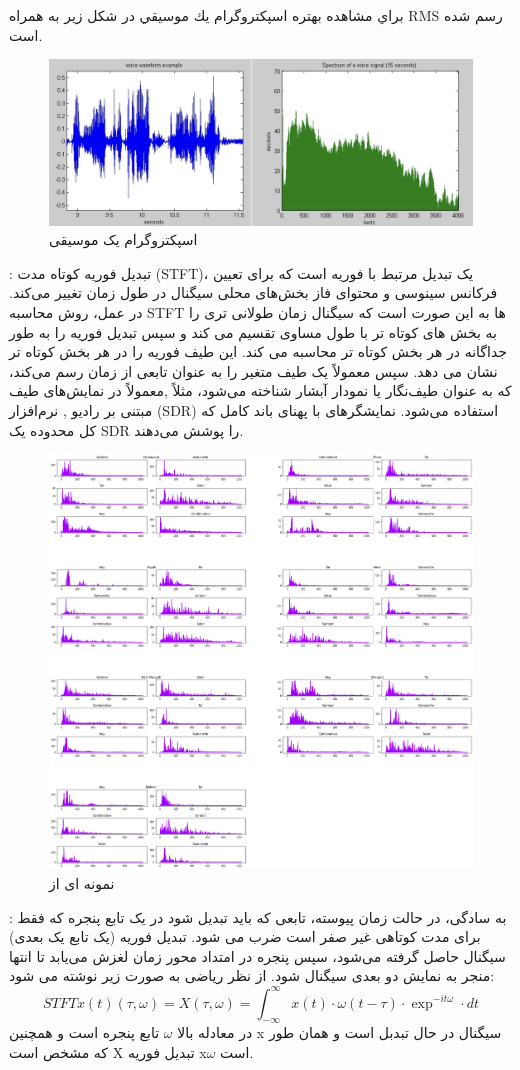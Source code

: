 \documentclass{article}
\begin{document}
براي مشاهده بهتره اسپكتروگرام يك موسيقي در شكل زير به همراه RMS رسم شده است.
\begin{figure}[h]
	\centering
	\includegraphics[width=0.7\linewidth]{Photo/4}
	\caption[اسپکتروگرام یک موسیقی]{اسپکتروگرام یک موسیقی}
	\label{fig:4}
\end{figure}\newline
{}:\newline
تبدیل فوریه کوتاه مدت (STFT)، یک تبدیل مرتبط با فوریه است که برای تعیین فرکانس سینوسی و محتوای فاز بخش‌های محلی سیگنال در طول زمان تغییر می‌کند. در عمل، روش محاسبه STFT ها به این صورت است که سیگنال زمان طولانی تری را به بخش های کوتاه تر با طول مساوی تقسیم می کند و سپس تبدیل فوریه را به طور جداگانه در هر بخش کوتاه تر محاسبه می کند. این طیف فوریه را در هر بخش کوتاه تر نشان می دهد. \newline
سپس معمولاً یک طیف متغیر را به عنوان تابعی از زمان رسم می‌کند، که به عنوان طیف‌نگار یا نمودار آبشار شناخته می‌شود، مثلاً ,معمولاً در نمایش‌های طیف مبتنی بر رادیو , نرم‌افزار (SDR) استفاده می‌شود. نمایشگرهای با پهنای باند کامل که کل محدوده یک SDR را پوشش می‌دهند.\newline
\begin{figure}[h]
	\centering
	\includegraphics[width=0.5\linewidth]{Photo/25}
	\caption[نمونه ای از ]{نمونه ای از }
	\label{fig:25}
\end{figure}

:\newline
به سادگی، در حالت زمان پیوسته، تابعی که باید تبدیل شود در یک تابع پنجره که فقط برای مدت کوتاهی غیر صفر است ضرب می شود. تبدیل فوریه (یک تابع یک بعدی) سیگنال حاصل گرفته می‌شود، سپس پنجره در امتداد محور زمان لغزش می‌یابد تا انتها منجر به نمایش دو بعدی سیگنال شود. از نظر ریاضی به صورت زیر نوشته می شود:
\begin{equation}
	STFT{x(t)}(\tau , \omega)=X(\tau , \omega)=\int_{-\infty}^{\infty} x(t)\cdot \omega(t- \tau)\cdot \exp^{-it\omega}\cdot dt
\end{equation}
در معادله بالا $\omega$ تابع پنجره است و همچنین x سیگنال در حال تبدبل است و همان طور که مشخص است X تبدیل فوریه x$\omega$ است.\newline
\end{document}
